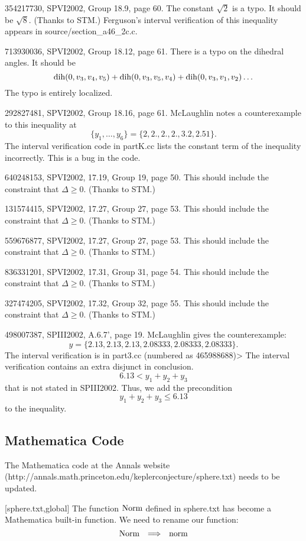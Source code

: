 \documentclass[11pt]{amsart}
\def\op#1{{\text{#1}}}
\def\to{{\quad\Longrightarrow\quad}}
\def\text{\hbox}
\begin{document}
354217730, SPVI2002, Group 18.9, page 60.
The constant $\sqrt2$ is a typo.  It should be $\sqrt8$.  (Thanks to STM.)
Ferguson's interval verification of this inequality appears
in source/section_a46_2c.c.

713930036, SPVI2002, Group 18.12, page 61.
There is a typo on the dihedral angles.  It should be
  $$
  \op{dih}(0,v_3,v_4,v_5)+\op{dih}(0,v_3,v_5,v_4)+\op{dih}(0,v_3,v_1,v_2)
  \ldots
  $$
The typo is entirely localized.

292827481, SPVI2002, Group 18.16, page 61.
McLaughlin notes a counterexample to this inequality at
$$
\{y_1,\ldots,y_6\} = \{2, 2., 2., 2., 3.2, 2.51\}.
$$
The interval verification code in partK.cc lists the constant term of
the inequality incorrectly.  This is a bug in the code.

640248153, SPVI2002, 17.19, Group 19, page 50.
This should include the constraint that $\Delta\ge0$. (Thanks to STM.)

131574415, SPVI2002, 17.27, Group 27, page 53.
This should include the constraint that $\Delta\ge0$. (Thanks to STM.)

559676877,  SPVI2002, 17.27, Group 27, page 53.
This should include the constraint that $\Delta\ge0$. (Thanks to STM.)

836331201, SPVI2002, 17.31, Group 31, page 54.
This should include the constraint that $\Delta\ge0$. (Thanks to STM.)

327474205, SPVI2002, 17.32, Group 32, page 55.
This should include the constraint that $\Delta\ge0$. (Thanks to STM.)

498007387, SPIII2002, A.6.7', page 19.
McLaughlin gives the counterexample:
$$
 y = \{2.13,2.13,2.13,2.08333,2.08333,2.08333\}.
$$
The interval verification is in part3.cc (numbered as 465988688)>
The interval verification contains an extra disjunct in conclusion.
$$6.13 < y_1 +  y_2 + y_3$$
that is not stated in SPIII2002. 
Thus, we add the precondition
$$y_1 + y_2 + y_3 \le 6.13$$
to the inequality.


\subsection{Mathematica Code}

The Mathematica code at the Annals website
(http://annals.math.princeton.edu/keplerconjecture/sphere.txt) needs to be updated.

[sphere.txt,global]
The function $\op{Norm}$ defined in sphere.txt
has become a Mathematica built-in function.
We need to rename our function: 
	$$\op{Norm} \to \op{norm}$$
	
\end{document}

